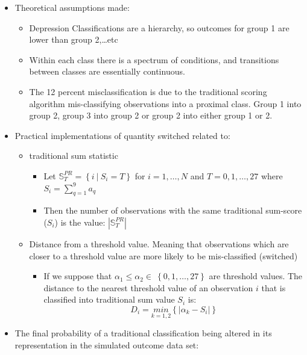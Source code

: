\documentclass[12pt,]{article}
\providecommand{\tightlist}{%
  \setlength{\itemsep}{0pt}\setlength{\parskip}{0pt}}
\begin{document}
\begin{itemize}
\tightlist
\item
  Theoretical assumptions made:

  \begin{itemize}
  \tightlist
  \item
    Depression Classifications are a hierarchy, so outcomes for group 1
    are lower than group 2,\ldots{}etc
  \item
    Within each class there is a spectrum of conditions, and transitions
    between classes are essentially continuous.
  \item
    The 12 percent misclassification is due to the traditional scoring
    algorithm mis-classifying observations into a proximal class. Group
    1 into group 2, group 3 into group 2 or group 2 into either group 1
    or 2.
  \end{itemize}
\item
  Practical implementations of quantity switched related to:

  \begin{itemize}
  \tightlist
  \item
    traditional sum statistic

    \begin{itemize}
    \tightlist
    \item
      Let \(\mathbb{S}^{PR}_{T}=\left \{ i\ \Big | \ S_{i}=T \right \}\)
      for \(i=1,\ldots, N\) and \(T=0, 1,\ldots, 27\) where
      \(S_{i} = \sum_{q=1}^{9} a_{q}\)
    \item
      Then the number of observations with the same traditional
      sum-score (\(S_{i}\)) is the value: \(|\mathbb{S}^{PR}_{T}|\)
    \end{itemize}
  \item
    Distance from a threshold value. Meaning that observations which are
    closer to a threshold value are more likely to be mis-classified
    (switched)

    \begin{itemize}
    \tightlist
    \item
      If we suppose that
      \(\alpha_{1} \leq \alpha_{2} \in \ \left \{ 0,1,\ldots, 27 \right \}\)
      are threshold values. The distance to the nearest threshold value
      of an observation \(i\) that is classified into traditional sum
      value \(S_{i}\) is:
      \[D_{i} = \underset{k=1,2}{min}\left \{ \Big | \alpha_{k}-S_{i}   \Big | \right \}\]
    \end{itemize}
  \end{itemize}
\item
  The final probability of a traditional classification being altered in
  its representation in the simulated outcome data set:


\end{itemize}
\end{document}
